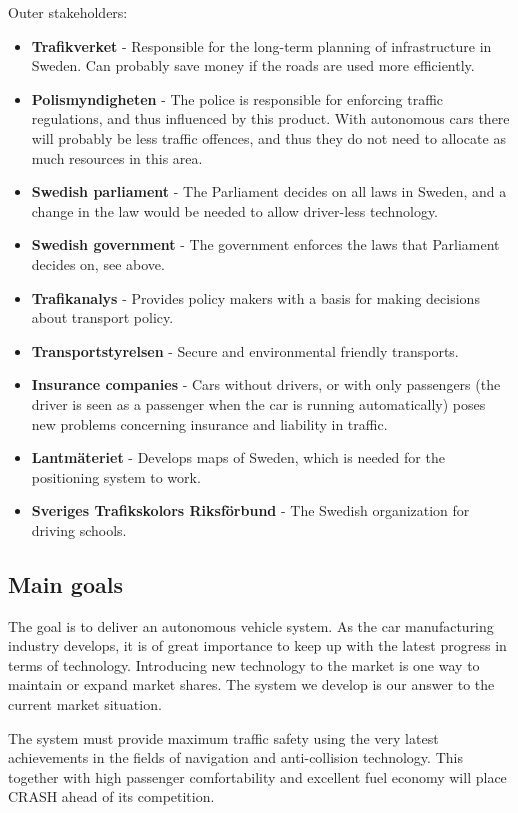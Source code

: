 \documentclass{article}
\begin{document}
\noindent Outer stakeholders:
\begin{itemize}
\item \textbf{Trafikverket} - Responsible for the long-term planning of infrastructure in Sweden. Can probably save money if the roads are used more efficiently. 
\item \textbf{Polismyndigheten} - The police is responsible for enforcing traffic regulations, and thus influenced by this product. With autonomous cars there will probably be less traffic offences, and thus they do not need to allocate as much resources in this area. 
\item \textbf{Swedish parliament} - The Parliament decides on all laws in Sweden, and a change in the law would be needed to allow driver-less technology.
\item \textbf{Swedish government} - The government enforces the laws that Parliament decides on, see above.
\item \textbf{Trafikanalys} - Provides policy makers with a basis for making decisions about transport policy.
\item \textbf{Transportstyrelsen} - Secure and environmental friendly transports.
\item \textbf{Insurance companies} - Cars without drivers, or with only passengers (the driver is seen as a passenger when the car is running automatically) poses new problems concerning insurance and liability in traffic.
\item \textbf{Lantmäteriet} - Develops maps of Sweden, which is needed for the positioning system to work.
\item \textbf{Sveriges Trafikskolors Riksförbund} - The Swedish organization for driving schools.
\end{itemize}

\subsection{Main goals}
The goal is to deliver an autonomous vehicle system. As the car manufacturing industry develops, it is of great importance to keep up with the latest progress in terms of technology. Introducing new technology to the market is one way to maintain or expand market shares. The system we develop is our answer to the current market situation.

The system must provide maximum traffic safety using the very latest achievements in the fields of navigation and anti-collision technology. This together with high passenger comfortability and excellent fuel economy will place CRASH ahead of its competition.
\end{document}
